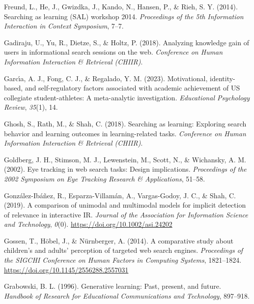 \documentclass[letterpaper, nobind]{templates/ociamthesis}
\newlength{\cslhangindent}
\newenvironment{CSLReferences}[2] %
 {%
  \setlength{\parindent}{0pt}
  \ifodd #1
  \let\oldpar\par
  \def\par{\hangindent=\cslhangindent\oldpar}
  \fi
  \setlength{\parskip}{1mm}
  \setlength{\baselineskip}{6mm}
 }%
 {}
\begin{document}
\begin{CSLReferences}{1}{0}
\leavevmode{}%
Freund, L., He, J., Gwizdka, J., Kando, N., Hansen, P., \& Rieh, S. Y. (2014). Searching as learning (SAL) workshop 2014. \emph{Proceedings of the 5th Information Interaction in Context Symposium}, 7--7.

\leavevmode{}%
Gadiraju, U., Yu, R., Dietze, S., \& Holtz, P. (2018). Analyzing knowledge gain of users in informational search sessions on the web. \emph{Conference on Human Information Interaction \& Retrieval (CHIIR)}.

\leavevmode{}%
Garcı́a, A. J., Fong, C. J., \& Regalado, Y. M. (2023). Motivational, identity-based, and self-regulatory factors associated with academic achievement of US collegiate student-athletes: A meta-analytic investigation. \emph{Educational Psychology Review}, \emph{35}(1), 14.

\leavevmode{}%
Ghosh, S., Rath, M., \& Shah, C. (2018). Searching as learning: Exploring search behavior and learning outcomes in learning-related tasks. \emph{Conference on Human Information Interaction \& Retrieval (CHIIR)}.

\leavevmode{}%
Goldberg, J. H., Stimson, M. J., Lewenstein, M., Scott, N., \& Wichansky, A. M. (2002). Eye tracking in web search tasks: Design implications. \emph{Proceedings of the 2002 Symposium on Eye Tracking Research \& Applications}, 51--58.

\leavevmode{}%
González-Ibáñez, R., Esparza-Villamán, A., Vargas-Godoy, J. C., \& Shah, C. (2019). A comparison of unimodal and multimodal models for implicit detection of relevance in interactive {IR}. \emph{Journal of the Association for Information Science and Technology}, \emph{0}(0). \url{https://doi.org/10.1002/asi.24202}

\leavevmode{}%
Gossen, T., Höbel, J., \& Nürnberger, A. (2014). A comparative study about children's and adults' perception of targeted web search engines. \emph{Proceedings of the {SIGCHI} Conference on Human Factors in Computing Systems}, 1821--1824. \url{https://doi.org/10.1145/2556288.2557031}

\leavevmode{}%
Grabowski, B. L. (1996). Generative learning: Past, present, and future. \emph{Handbook of Research for Educational Communications and Technology}, 897--918.


\end{CSLReferences}
\end{document}
